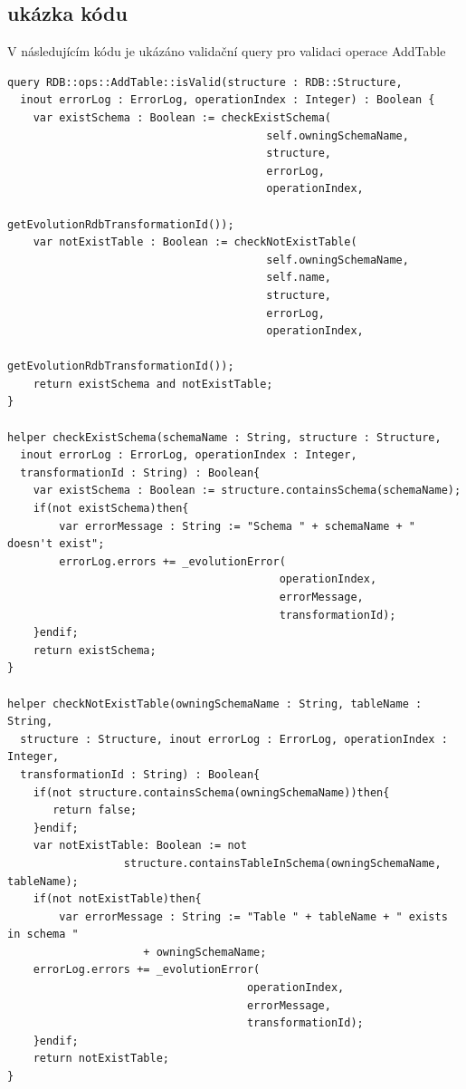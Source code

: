 \documentclass[11pt,twoside,a4paper]{book}
\begin{document}
\subsection{ukázka kódu}
V následujícím kódu je ukázáno validační query pro validaci operace AddTable
\begin{verbatim}
query RDB::ops::AddTable::isValid(structure : RDB::Structure, 
  inout errorLog : ErrorLog, operationIndex : Integer) : Boolean {
    var existSchema : Boolean := checkExistSchema(
                                        self.owningSchemaName, 
                                        structure, 
                                        errorLog, 
                                        operationIndex, 
                                        getEvolutionRdbTransformationId());
    var notExistTable : Boolean := checkNotExistTable(
                                        self.owningSchemaName, 
                                        self.name, 
                                        structure, 
                                        errorLog, 
                                        operationIndex, 
                                        getEvolutionRdbTransformationId());
    return existSchema and notExistTable;
}

helper checkExistSchema(schemaName : String, structure : Structure, 
  inout errorLog : ErrorLog, operationIndex : Integer, 
  transformationId : String) : Boolean{ 
    var existSchema : Boolean := structure.containsSchema(schemaName);
    if(not existSchema)then{
        var errorMessage : String := "Schema " + schemaName + " doesn't exist";
        errorLog.errors += _evolutionError(
                                          operationIndex, 
                                          errorMessage,
                                          transformationId); 
    }endif;
    return existSchema;	
}

helper checkNotExistTable(owningSchemaName : String, tableName : String, 
  structure : Structure, inout errorLog : ErrorLog, operationIndex : Integer,
  transformationId : String) : Boolean{ 
    if(not structure.containsSchema(owningSchemaName))then{
       return false;
    }endif;
    var notExistTable: Boolean := not
                  structure.containsTableInSchema(owningSchemaName, tableName); 
    if(not notExistTable)then{ 
        var errorMessage : String := "Table " + tableName + " exists in schema "
                     + owningSchemaName;
    errorLog.errors += _evolutionError(
                                     operationIndex, 
                                     errorMessage,
                                     transformationId); 
    }endif;
	return notExistTable;
}
\end{verbatim}
\end{document}
